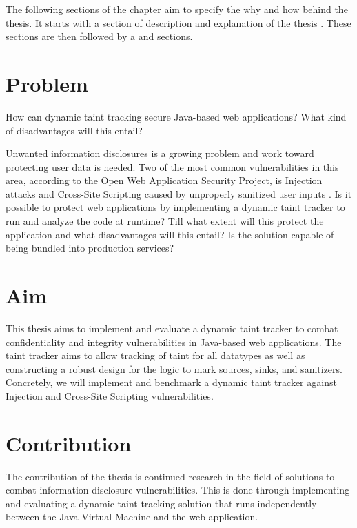 The following sections of the chapter aim to specify the why and how behind the thesis. It starts with a section of \textit{} description and explanation of the thesis \textit{}. These sections are then followed by a \textit{} and \textit{} sections.



\section{Problem}
\label{Problem}
\begin{chapquote}{}
    How can dynamic taint tracking secure Java-based web applications? What kind of disadvantages will this entail?
\end{chapquote}

\noindent
Unwanted information disclosures is a growing problem and work toward protecting user data is needed. Two of the most common vulnerabilities in this area, according to the Open Web Application Security Project, is Injection attacks and Cross-Site Scripting caused by unproperly sanitized user inputs \parencite{OWASP2017}. Is it possible to protect web applications by implementing a dynamic taint tracker to run and analyze the code at runtime? Till what extent will this protect the application and what disadvantages will this entail? Is the solution capable of being bundled into production services?



\section{Aim}
\label{Aim}
This thesis aims to implement and evaluate a dynamic taint tracker to combat confidentiality and integrity vulnerabilities in Java-based web applications. The taint tracker aims to allow tracking of taint for all datatypes as well as constructing a robust design for the logic to mark sources, sinks, and sanitizers. Concretely, we will implement and benchmark a dynamic taint tracker against Injection and Cross-Site Scripting vulnerabilities. 



\section{Contribution}
\label{Contribution}
The contribution of the thesis is continued research in the field of solutions to combat information disclosure vulnerabilities. This is done through implementing and evaluating a dynamic taint tracking solution that runs independently between the Java Virtual Machine and the web application. 



